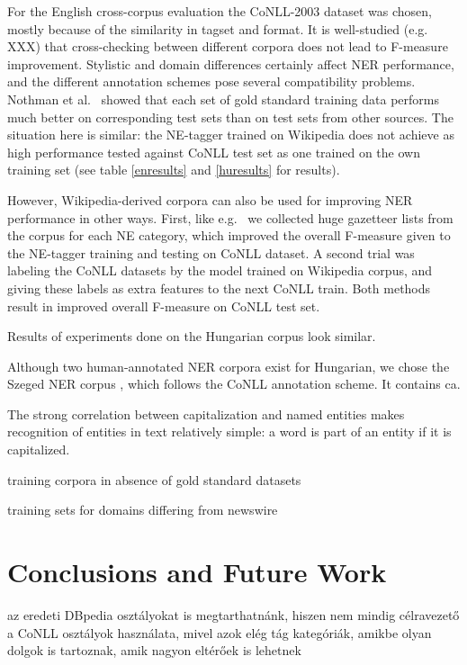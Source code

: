 \documentclass[11pt]{article}
\begin{document}
For the English cross-corpus evaluation the CoNLL-2003 dataset was chosen, mostly because of the similarity in tagset and format. It is well-studied (e.g. XXX) that cross-checking between different corpora does not lead to F-measure improvement. Stylistic and domain differences certainly affect NER performance, and the different annotation schemes pose several compatibility problems. Nothman et al.~ showed that each set of gold standard training data performs much better on corresponding test sets than on test sets from other sources. The situation here is similar: the NE-tagger trained on Wikipedia does not achieve as high performance tested against CoNLL test set as one trained on the own training set (see table \ref{enresults} and \ref{huresults} for results). 

However, Wikipedia-derived corpora can also be used for improving NER performance in other ways. First, like e.g.~\cite{Toral:06} we collected huge gazetteer lists from the corpus for each NE category, which improved the overall F-measure given to the NE-tagger training and testing on CoNLL dataset. A second trial was labeling the CoNLL datasets by the model trained on Wikipedia corpus, and giving these labels as extra features to the next CoNLL train. Both methods result in improved overall F-measure on CoNLL test set.  

Results of experiments done on the Hungarian corpus look similar.  

Although two human-annotated NER corpora exist for Hungarian, we chose the Szeged NER corpus \cite{}, which follows the CoNLL annotation scheme. It contains ca. 

The strong correlation between capitalization and named entities makes recognition of entities in text relatively simple: a word is part of an entity if it is capitalized.

training corpora in absence of gold standard datasets

training sets for domains differing from newswire

\section{Conclusions and Future Work}

az eredeti DBpedia osztályokat is megtarthatnánk, hiszen nem mindig célravezető a CoNLL osztályok használata, mivel azok elég tág kategóriák, amikbe olyan dolgok is tartoznak, amik nagyon eltérőek is lehetnek
\end{document}
